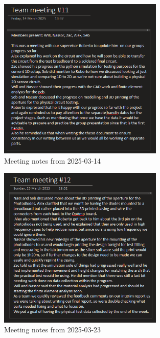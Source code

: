                                     
                                    \begin{figure}[htbp]
                                        \centering
                                        \includegraphics[width=0.7\textwidth]{figures/Appendix-MeetingNotes/meeting_note_11.png}
                                        \caption*{Meeting notes from 2025-03-14} 
                                        \label{fig:meeting11}
                                        \end{figure}

                                        

                                        \begin{figure}[htbp]
                                            \centering
                                            \includegraphics[width=0.7\textwidth]{figures/Appendix-MeetingNotes/meetingNote12.png}
                                            \caption*{Meeting notes from 2025-03-23} 
                                            \label{fig:meeting12}
                                            \end{figure}
                                        
